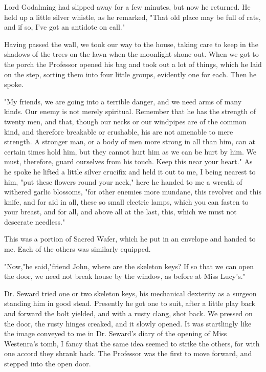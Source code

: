 Lord Godalming had slipped away for a few minutes, but now he returned. He held up a little silver whistle, as he remarked, "That old place may be full of rats, and if so, I've got an antidote on call." 

Having passed the wall, we took our way to the house, taking care to keep in the shadows of the trees on the lawn when the moonlight shone out. When we got to the porch the Professor opened his bag and took out a lot of things, which he laid on the step, sorting them into four little groups, evidently one for each. Then he spoke. 

"My friends, we are going into a terrible danger, and we need arms of many kinds. Our enemy is not merely spiritual. Remember that he has the strength of twenty men, and that, though our necks or our windpipes are of the common kind, and therefore breakable or crushable, his are not amenable to mere strength. A stronger man, or a body of men more strong in all than him, can at certain times hold him, but they cannot hurt him as we can be hurt by him. We must, therefore, guard ourselves from his touch. Keep this near your heart." As he spoke he lifted a little silver crucifix and held it out to me, I being nearest to him, "put these flowers round your neck," here he handed to me a wreath of withered garlic blossoms, "for other enemies more mundane, this revolver and this knife, and for aid in all, these so small electric lamps, which you can fasten to your breast, and for all, and above all at the last, this, which we must not desecrate needless." 

This was a portion of Sacred Wafer, which he put in an envelope and handed to me. Each of the others was similarly equipped. 

"Now,"he said,"friend John, where are the skeleton keys? If so that we can open the door, we need not break house by the window, as before at Miss Lucy's." 

Dr. Seward tried one or two skeleton keys, his mechanical dexterity as a surgeon standing him in good stead. Presently he got one to suit, after a little play back and forward the bolt yielded, and with a rusty clang, shot back. We pressed on the door, the rusty hinges creaked, and it slowly opened. It was startlingly like the image conveyed to me in Dr. Seward's diary of the opening of Miss Westenra's tomb, I fancy that the same idea seemed to strike the others, for with one accord they shrank back. The Professor was the first to move forward, and stepped into the open door. 

